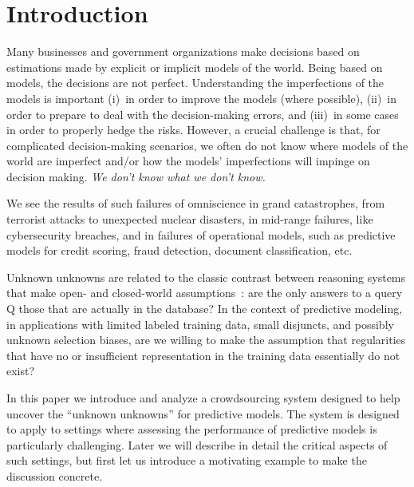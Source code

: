 \section{Introduction}
\label{sec:intro}


Many businesses and government organizations make decisions based on
estimations made by explicit or implicit models of the world.  Being
based on models, the decisions are not perfect.  Understanding the
imperfections of the models is important (i)~in order to improve the
models (where possible), (ii)~in order to prepare to deal with the
decision-making errors, and (iii)~in some cases in order to properly
hedge the risks.  However, a crucial challenge is that, for 
complicated decision-making scenarios, we often do not know where 
models of the world are imperfect and/or how the models' imperfections
will impinge on decision making. \emph{ We don't know what we don't know.}

We see the results of such failures of omniscience in grand
catastrophes, from terrorist attacks to unexpected nuclear disasters,
in mid-range failures, like cybersecurity breaches, and in failures of
operational models, such as predictive models for credit scoring,
fraud detection, document classification, etc.

Unknown unknowns are related to the classic contrast between reasoning
systems that make open- and closed-world
assumptions~\cite{Reiter77closedworld}: are the only answers to a query Q those
that are actually in the database?  In the context of predictive
modeling, in applications with limited labeled training data, small
disjuncts\cite{weiss10disjunct}, and possibly unknown selection biases, are
we willing to make the assumption that regularities that have no or
insufficient representation in the training data essentially do not
exist?


In this paper we introduce and analyze a crowdsourcing system designed
to help uncover the ``unknown unknowns'' for predictive models.  The
system is designed to apply to settings where assessing the
performance of predictive models is particularly challenging.  Later we
will describe in detail the critical aspects of such settings, but
first let us introduce a motivating example to make the discussion
concrete.

